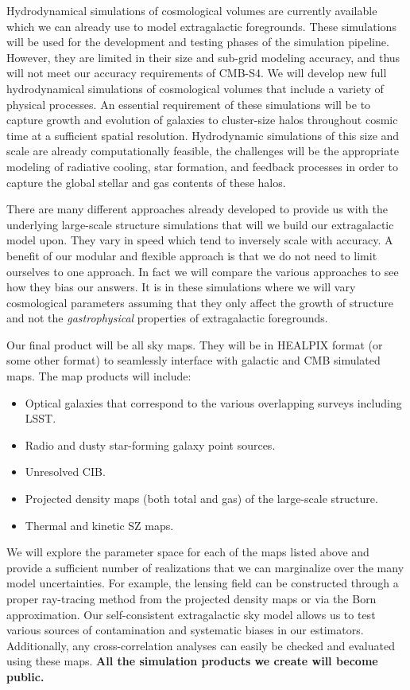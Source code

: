 Hydrodynamical simulations of cosmological volumes are currently available which we can already use to model extragalactic foregrounds. These simulations will be used for the development and testing phases of the simulation pipeline. However, they are limited in their size and sub-grid modeling accuracy, and thus will not meet our accuracy requirements of CMB-S4. We will develop new full hydrodynamical simulations of cosmological volumes that include a variety of physical processes. An essential requirement of these simulations will be to capture growth and evolution of galaxies to cluster-size halos throughout cosmic time at a sufficient spatial resolution. Hydrodynamic simulations of this size and scale are already computationally feasible, the challenges will be the appropriate modeling of radiative cooling, star formation, and feedback processes in order to capture the global stellar and gas contents of these halos.

There are many different approaches already developed to provide us with the underlying large-scale structure simulations that will we build our extragalactic model upon. They vary in speed which tend to inversely scale with accuracy. A benefit of our modular and flexible approach is that we do not need to limit ourselves to one approach. In fact we will compare the various approaches to see how they bias our answers. It is in these simulations where we will vary cosmological parameters assuming that they only affect the growth of structure and not the {\it gastrophysical} properties of extragalactic foregrounds.

Our final product will be all sky maps. They will be in HEALPIX format (or some other format) to seamlessly interface with galactic and CMB simulated maps. The map products will include:

\begin{itemize}
\item Optical galaxies that correspond to the various overlapping surveys including LSST.
\item Radio and dusty star-forming galaxy point sources.
\item Unresolved CIB.
\item Projected density maps (both total and gas) of the large-scale structure.
\item Thermal and kinetic SZ maps.
\end{itemize}

\noindent We will explore the parameter space for each of the maps listed above and provide a sufficient number of realizations that we can marginalize over the many model uncertainties. For example, the lensing field can be constructed through a proper ray-tracing method from the projected density maps or via the Born approximation. Our self-consistent extragalactic sky model allows us to test various sources of contamination and systematic biases in our estimators. Additionally, any cross-correlation analyses can easily be checked and evaluated using these maps. {\bf All the simulation products we create will become public.}

%



